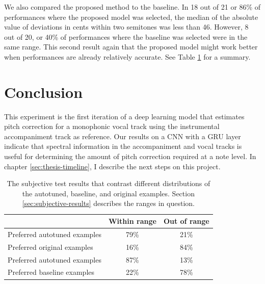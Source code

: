 We also compared the proposed method to the baseline. In 18 out of 21 or 86\% of performances where the proposed model was selected, the median of the absolute value of deviations in cents within two semitones was less than 46. However, 8 out of 20, or 40\% of performances where the baseline was selected were in the same range. This second result again that the proposed model might work better when performances are already relatively accurate. See Table \ref{tab:result-autotune} for a summary. 

\section{Conclusion}
This experiment is the first iteration of a deep learning model that estimates pitch correction for a monophonic vocal track using the instrumental accompaniment track as reference. Our results on a CNN with a GRU layer indicate that spectral information in the accompaniment and vocal tracks is useful for determining the amount of pitch correction required at a note level. In chapter \ref{sec:thesis-timeline}, I describe the next steps on this project.





\begin{table}[t]
  \begin{center}
  \vspace{-0.05in}
    \caption{The subjective test results that contrast different distributions of the autotuned, baseline, and original examples. Section \ref{sec:subjective-results} describes the ranges in question.}
    \begin{tabular}{|l||c|c|}
    \hline
      & Within range & Out of range \\
      \hline
      Preferred autotuned examples & 79\% & 21\% \\
      Preferred original examples & 16\% & 84\% \\
      \hline
      Preferred autotuned examples & 87\% & 13\% \\
      Preferred baseline examples & 22\% & 78\% \\
      \hline
    \end{tabular}
    \vspace{-0.2in}
    \label{tab:result-autotune}
  \end{center}
\end{table}
